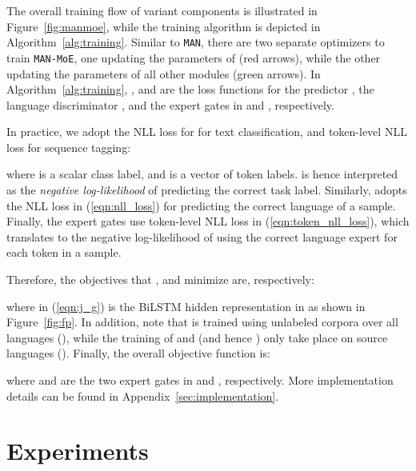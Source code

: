 \documentclass[11pt,a4paper]{article}
\newcommand{\manmoe}{\texttt{MAN-MoE}}
\newcommand{\man}{\texttt{MAN}}
\begin{document}
The overall training flow of variant components is illustrated in Figure~\ref{fig:manmoe}, while the training algorithm is depicted in Algorithm~\ref{alg:training}.
Similar to \man{}, there are two separate optimizers to train \manmoe{}, one updating the parameters of  (red arrows), while the other updating the parameters of all other modules (green arrows).
In Algorithm~\ref{alg:training}, ,  and  are the loss functions for the predictor , the language discriminator , and the expert gates in  and , respectively.

In practice, we adopt the NLL loss for  for text classification, and token-level NLL loss for sequence tagging:

where  is a scalar class label, and  is a vector of token labels.
 is hence interpreted as the \emph{negative log-likelihood} of predicting the correct task label.
Similarly,  adopts the NLL loss in (\ref{eqn:nll_loss}) for predicting the correct language of a sample.
Finally, the expert gates  use token-level NLL loss in (\ref{eqn:token_nll_loss}), which translates to the negative log-likelihood of using the correct language expert for each token in a sample.

Therefore, the objectives that ,  and  minimize are, respectively:

where  in (\ref{eqn:j_g}) is the BiLSTM hidden representation in  as shown in Figure~\ref{fig:fp}.
In addition, note that  is trained using unlabeled corpora over all languages (), while the training of  and  (and hence ) only take place on source languages ().
Finally, the overall objective function is:

where  and  are the two expert gates in  and , respectively.
More implementation details can be found in Appendix~\ref{sec:implementation}. \section{Experiments}\label{sec:exp}
\end{document}
